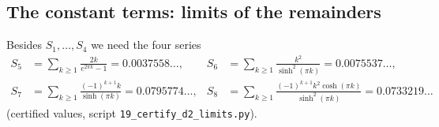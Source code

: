 \documentclass[11pt,a4paper]{article}
\theoremstyle{plain}
\theoremstyle{definition}
\numberwithin{equation}{section}
\begin{document}
\subsection{The constant terms: limits of the remainders}
Besides $S_1,\dots,S_4$ we need the four series
\begin{equation}\label{eq:S58}
\begin{aligned}S_5&=\sum_{k\ge1}\frac{2k}{e^{2\pi k}-1}=0.0037558\ldots,&S_6&=\sum_{k\ge1}\frac{k^2}{\sinh^2(\pi k)}=0.0075537\ldots,\\
S_7&=\sum_{k\ge1}\frac{(-1)^{k+1}k}{\sinh(\pi k)}=0.0795774\ldots,&S_8&=\sum_{k\ge1}\frac{(-1)^{k+1}k^2\cosh(\pi k)}{\sinh^2(\pi k)}=0.0733219\ldots\end{aligned}
\end{equation}
(certified values, script \texttt{19\_certify\_d2\_limits.py}).
\end{document}
